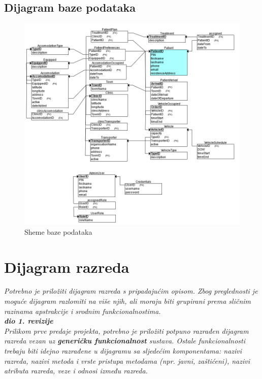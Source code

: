 			\subsection{Dijagram baze podataka}
				\begin{figure}[H]
					\includegraphics[width=\textwidth]{slike/DB_shema.PNG} %
					\caption{Sheme baze podataka}
					\label{fig:db_scheme} %
				\end{figure}
			\eject
			
			\newpage
			
		\section{Dijagram razreda}
		
			\textit{Potrebno je priložiti dijagram razreda s pripadajućim opisom. Zbog preglednosti je moguće dijagram razlomiti na više njih, ali moraju biti grupirani prema sličnim razinama apstrakcije i srodnim funkcionalnostima.}\\
			
			\textbf{\textit{dio 1. revizije}}\\
			
			\textit{Prilikom prve predaje projekta, potrebno je priložiti potpuno razrađen dijagram razreda vezan uz \textbf{generičku funkcionalnost} sustava. Ostale funkcionalnosti trebaju biti idejno razrađene u dijagramu sa sljedećim komponentama: nazivi razreda, nazivi metoda i vrste pristupa metodama (npr. javni, zaštićeni), nazivi atributa razreda, veze i odnosi između razreda.}\\
			
